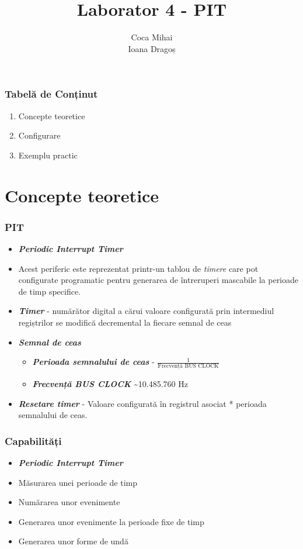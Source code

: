 \documentclass[xcolor={table}]{beamer}
\title{Laborator 4 - PIT}
\subtitle{}
\author{Coca Mihai \\
        Ioana Dragoș}
\begin{document}
	\setcounter{showProgressBar}{0}
	\setcounter{showSlideNumbers}{0}

	\frame{\titlepage}

	\begin{frame}
		\frametitle{Tabelă de Conținut}
		\begin{enumerate}
            \item Concepte teoretice
			\item Configurare
			\item Exemplu practic
		\end{enumerate}
	\end{frame}

	\setcounter{framenumber}{0}
	\setcounter{showProgressBar}{1}
	\setcounter{showSlideNumbers}{1}
	\section{Concepte teoretice}
	\begin{frame}
	    \frametitle{PIT}
	    \begin{itemize}
	        \item \textbf{\textit{Periodic Interrupt Timer}}
	        \item Acest periferic este reprezentat printr-un tablou de \textit{timere} care pot configurate programatic pentru generarea de întreruperi mascabile la perioade de timp specifice.
	        \item \textbf{\textit{Timer}} - numărător digital a cărui valoare configurată prin intermediul regiștrilor se modifică decremental la fiecare semnal de ceas
	        \item \textbf{\textit{Semnal de ceas}}
	        \begin{itemize}
	            \item \textbf{\textit{Perioada semnalului de ceas}} - $\frac{1}{\text{Frecvență BUS CLOCK}}$ \\
	            \item \textbf{\textit{Frecvență BUS CLOCK}} \sim 10.485.760 Hz \\
	        \end{itemize}
	        \item \textbf{\textit{Resetare timer}} -  Valoare configurată în registrul asociat * perioada semnalului de ceas. \\
	        
	    \end{itemize}
	\end{frame}
		\begin{frame}
	    \frametitle{Capabilități}
	    \begin{itemize}
	        \item \textbf{\textit{Periodic Interrupt Timer}}
	        \item Măsurarea unei perioade de timp
	        \item Numărarea unor evenimente
	        \item Generarea unor evenimente la perioade fixe de timp
	        \item Generarea unor forme de undă
	    \end{itemize}
	\end{frame}
\end{document}

